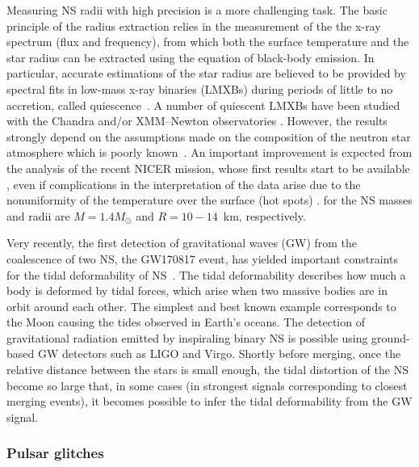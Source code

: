 Measuring NS radii with high precision is a more challenging task.
The basic principle of the radius extraction relies in the measurement of the 
the x-ray spectrum (flux and frequency), from which both the surface 
temperature and the star radius can be extracted using the equation of 
black-body emission.
In particular, accurate estimations of the star radius are believed to be 
provided by spectral fits in low-mass x-ray binaries (LMXBs) during periods of 
little to no accretion, called quiescence~\cite{Brown1998}.
%
A number of quiescent LMXBs have been studied with the Chandra and/or 
XMM–Newton 
observatories \cite{Heinke2014,Servillat2012,Guillot2014,Guillot2013}.
%
However, the results strongly depend on the assumptions made on the composition
of the neutron star atmosphere which is poorly known~\cite{Steiner2018}. 
An important improvement is expected from the analysis of the recent NICER 
mission, whose first results start to be available 
\cite{Bogdanov2019a,Bogdanov2019b,Miller2019,Raaijmakers2019,Riley2019}, 
even if complications in the interpretation of the 
data arise due to the nonuniformity of the temperature over the surface (hot
spots) \cite{Bogdanov2019a,Bogdanov2019b,Miller2019,Raaijmakers2019,Riley2019}. 
 for the NS masses and radii are $M = 1.4M_\odot$ and
$R=10-14$~km, respectively.
 
Very recently, the first detection of gravitational waves (GW) from the 
coalescence 
of two NS, the GW170817 event, has yielded important constraints for the tidal 
deformability of NS~\cite{GW1}.
The tidal deformability describes how much a body is deformed by tidal forces,
which arise when two massive bodies are in orbit around each other. 
The simplest and best known example corresponds to the Moon causing the tides 
observed in Earth's oceans.
The detection of gravitational radiation emitted by inspiraling binary NS 
is possible using ground-based GW detectors such as LIGO 
and Virgo. 
Shortly before merging, once the relative distance between the stars is small
enough, the tidal distortion of the NS become so large that, in some cases (in
strongest signals corresponding to closest merging events), it becomes possible 
to infer the tidal deformability from the GW signal. 

\subsubsection*{Pulsar glitches}

